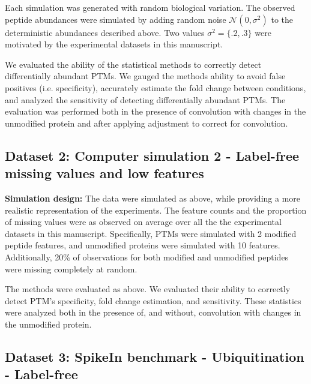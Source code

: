 \documentclass[mcp]{article}
\numberwithin{table}{section}
\begin{document}
Each simulation was generated with random biological variation. The observed peptide abundances were simulated by adding random noise $\mathcal{N}(0,\sigma^2)$ to the deterministic abundances described above. Two values $\sigma^2 = \{.2, .3\}$ were motivated by the experimental datasets in this manuscript.

\medskip {} We evaluated the ability of the statistical methods to correctly detect differentially abundant PTMs. We gauged the methods ability to avoid false positives (i.e. specificity), accurately estimate the fold change between conditions, and analyzed the sensitivity of detecting differentially abundant PTMs. The evaluation was performed both in the presence of convolution with changes in the unmodified protein and after applying adjustment to correct for convolution.

\subsection*{Dataset 2: Computer simulation 2 - Label-free missing values and low features}
\label{sec:comp_sim_procedure2}

{\bf Simulation design:} The data were simulated as above, while providing a more realistic representation of the experiments. The feature counts and the proportion of missing values were as observed on average over all the the experimental datasets in this manuscript. Specifically, PTMs were simulated with 2 modified peptide features, and unmodified proteins were simulated with 10 features. Additionally, 20\% of observations for both modified and unmodified peptides were missing completely at random.

\medskip {} The methods were evaluated as above. We evaluated their ability to correctly detect PTM's specificity, fold change estimation, and sensitivity. These statistics were analyzed both in the presence of, and without, convolution with changes in the unmodified protein.
 
\subsection*{Dataset 3: SpikeIn benchmark - Ubiquitination - Label-free}
\label{sec:exp_proc_dataset3}
\end{document}
